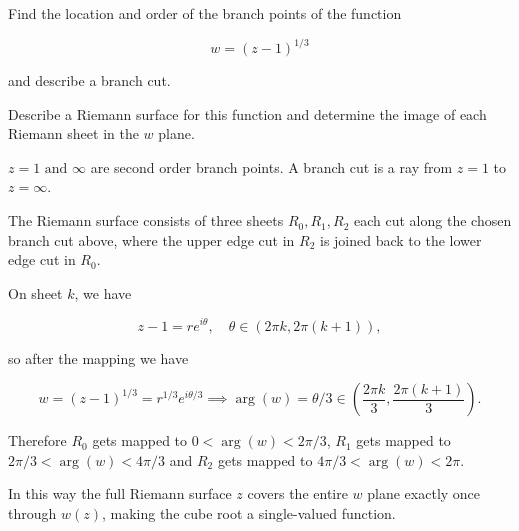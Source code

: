 \documentclass[english,a4paper,12pt]{report}
\begin{document}

{Find the location and order of the branch points of the function 

\begin{equation}
    w = (z-1)^{1 /3}
\end{equation}

and describe a branch cut. 

Describe a Riemann surface for this function and determine the image of each Riemann sheet in the \(w\) plane.
}
{\(z = 1 \text { and } \infty\) are second order branch points. A branch cut is a ray from \(z = 1\) to \(z = \infty\).

The Riemann surface consists of three sheets \(R_0 ,R_1 ,R_2 \) each cut along the chosen branch cut above, where the upper edge cut in \(R_2 \) is joined back to the lower edge cut in \(R_0\).

On sheet \(k\), we have 

\begin{equation}
    z-1 = re^{i \theta }, \quad \theta \in (2\pi k, 2\pi (k+1)), 
\end{equation}

so after the mapping we have

\begin{equation}
    w = (z-1)^{1 /3} = r^{1/3} e^{i \theta /3} \implies \arg (w) = \theta /3 \in \left( \frac{2\pi k}{3}, \frac{2\pi (k+1)}{3}   \right).
\end{equation}

Therefore \(R_0 \) gets mapped to \(0 < \arg (w) < 2\pi /3\), \(R_1 \) gets mapped to \(2\pi /3 < \arg (w) < 4\pi /3\) and \(R_2 \) gets mapped to \(4\pi /3 < \arg (w) < 2\pi \).      

In this way the full Riemann surface \(z\) covers the entire \(w\) plane exactly once through \(w(z)\), making the cube root a single-valued function.
}
\end{document}
